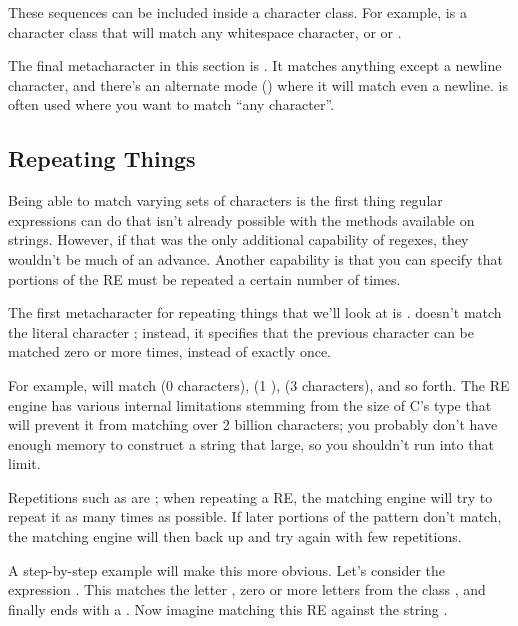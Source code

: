 \documentclass{howto}
\begin{document}
These sequences can be included inside a character class.  For
example, \regexp{[\e s,.]} is a character class that will match any
whitespace character, or \character{,} or .

The final metacharacter in this section is .  It matches
anything except a newline character, and there's an alternate mode
() where it will match even a newline.  
is often used where you want to match ``any character''.  

\subsection{Repeating Things}

Being able to match varying sets of characters is the first thing
regular expressions can do that isn't already possible with the
methods available on strings.  However, if that was the only
additional capability of regexes, they wouldn't be much of an advance.
Another capability is that you can specify that portions of the RE
must be repeated a certain number of times.

The first metacharacter for repeating things that we'll look at is
\regexp{*}.  \regexp{*} doesn't match the literal character \samp{*};
instead, it specifies that the previous character can be matched zero
or more times, instead of exactly once.

For example,  will match  (0 
characters),  (1 ),  (3 
characters), and so forth.  The RE engine has various internal
limitations stemming from the size of C's  type that will
prevent it from matching over 2 billion  characters; you
probably don't have enough memory to construct a string that large, so
you shouldn't run into that limit.

Repetitions such as \regexp{*} are ; when repeating a RE,
the matching engine will try to repeat it as many times as possible.
If later portions of the pattern don't match, the matching engine will
then back up and try again with few repetitions.

A step-by-step example will make this more obvious.  Let's consider
the expression .  This matches the letter
, zero or more letters from the class \code{[bcd]}, and
finally ends with a .  Now imagine matching this RE
against the string .  
\end{document}
